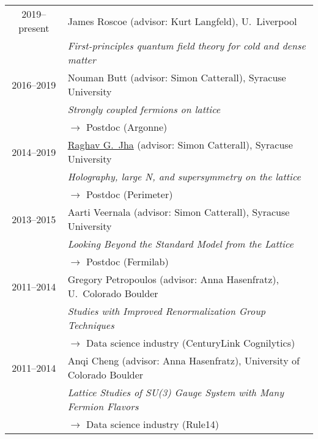 \documentclass[10 pt]{article}
\newcommand{\lra}{\ensuremath{\longrightarrow} }
\begin{document}
\vspace{-12 pt} %
\begin{tabular}[t]{cl}
  2019--present & James Roscoe (advisor: Kurt Langfeld), U.~Liverpool                                         \\
                & \textit{First-principles quantum field theory for cold and dense matter}                    \\[6 pt]
  2016--2019    & Nouman Butt (advisor: Simon Catterall), Syracuse University                                 \\
                & \textit{Strongly coupled fermions on lattice}                                               \\
                & \qquad \lra Postdoc (Argonne)                                                               \\[6 pt]
  2014--2019    & \href{http://raghavgjha.net}{Raghav G.~Jha} (advisor: Simon Catterall), Syracuse University \\
                & \textit{Holography, large N, and supersymmetry on the lattice}                              \\
                & \qquad \lra Postdoc (Perimeter)                                                             \\[6 pt]
  2013--2015    & Aarti Veernala (advisor: Simon Catterall), Syracuse University                              \\
                & \textit{Looking Beyond the Standard Model from the Lattice}                                 \\
                & \qquad \lra Postdoc (Fermilab)                                                              \\[6 pt]
  2011--2014    & Gregory Petropoulos (advisor: Anna Hasenfratz), U.~Colorado Boulder                         \\
                & \textit{Studies with Improved Renormalization Group Techniques}                             \\
                & \qquad \lra Data science industry (CenturyLink Cognilytics)                                 \\[6 pt]
  2011--2014    & Anqi Cheng (advisor: Anna Hasenfratz), University of Colorado Boulder                       \\
                & \textit{Lattice Studies of SU(3) Gauge System with Many Fermion Flavors}                    \\
                & \qquad \lra Data science industry (Rule14)                                                  \\
\end{tabular}
\end{document}
